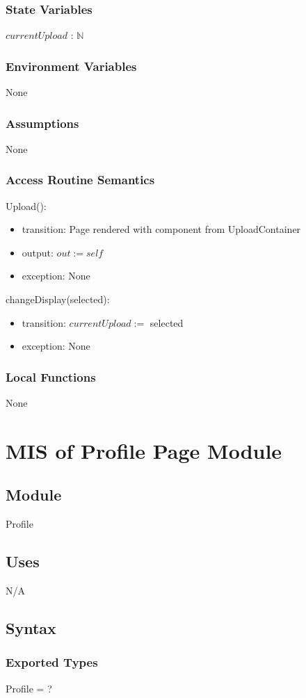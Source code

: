 \documentclass[12pt, titlepage]{article}
\begin{document}
\subsubsection{State Variables}
$currentUpload$ : $\mathbb{N}$
\subsubsection{Environment Variables}
None
\subsubsection{Assumptions}
None
\subsubsection{Access Routine Semantics}
\noindent Upload():
\begin{itemize}
	\item transition: Page rendered with component from UploadContainer
	\item output: $out := self$
	\item exception: None
\end{itemize}

\noindent changeDisplay(selected):
\begin{itemize}
	\item transition: $currentUpload :=$ selected
	\item exception: None
\end{itemize}
\subsubsection{Local Functions}
None

\newpage

\section{MIS of Profile Page Module} \label{ProfilePage}
\subsection{Module}
Profile
\subsection{Uses}
N/A
\subsection{Syntax}
\subsubsection{Exported Types}
Profile = ?
\end{document}

